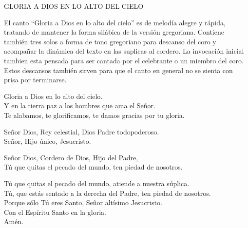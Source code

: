 \documentclass[12pt, letterpaper]{report}
\begin{document}



    \begin{center}
      {\large GLORIA A DIOS EN LO ALTO DEL CIELO}
    \end{center}

    El canto ``Gloria a Dios en lo alto del cielo'' es de melod\'ia alegre y r\'apida, tratando de mantener la forma sil\'abica de la versi\'on gregoriana. Contiene tambi\'en tres solos a forma de tono gregoriano para descanso del coro y acompa\~nar la din\'amica del texto en las suplicas al cordero. La invocaci\'on inicial tambien esta pensada para ser cantada por el celebrante o un miembro del coro.  Estos descansos tambi\'en sirven para que el canto en general no se sienta con prisa por terminarse.

    \noindent
    Gloria a Dios en lo alto del cielo.\\
    Y en la tierra paz a los hombres que ama el Se\~nor. \\
    Te alabamos, te glorificamos, te damos gracias por tu gloria.

    \noindent
    Se\~nor Dios, Rey celestial, Dios Padre todopoderoso. \\
    Se\~nor, Hijo \'unico, Jesucristo.

    \noindent
    Se\~nor Dios, Cordero de Dios, Hijo del Padre, \\
    T\'u que quitas el pecado del mundo, ten piedad de nosotros.

    \noindent
    T\'u que quitas el pecado del mundo, atiende a nuestra s\'uplica. \\
    T\'u, que est\'as sentado a la derecha del Padre, ten piedad de nosotros.\\
    Porque s\'olo T\'u eres Santo, Se\~nor alt\'isimo Jesucristo. \\
    Con el Esp\'iritu Santo en la gloria.\\
    Am\'en.
    \clearpage
\end{document}
